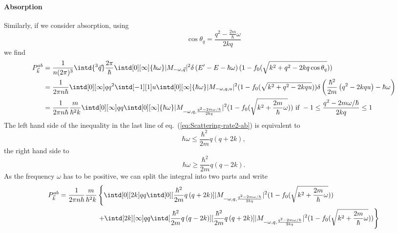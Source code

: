 \documentclass[physics,phd,nolot,nolof]{uccthesis}%
\begin{document}
{\paragraph*{Absorption}
Similarly, if we consider absorption, using
\begin{equation}
  \cos\theta_q=\frac{q^2 -\frac{2m}{\hbar}\omega}{2kq}
  \label{eq:costhetaq-ab}
\end{equation}
we find
\begin{equation}
  \begin{split}
  P^{ab}_{\vec k}
&  =\frac{1}{n(2\pi)^3}\intd{^3\vec q} 
  \frac{2\pi}{\hbar} 
  \intd[0][\infty]{\hbar\omega}|M_{-\omega,\vec q}|^2 \delta\left(E' - E -\hbar\omega \right)
  (1-f_0( \sqrt{k^2 +q^2 -2 kq \cos\theta_q}))\\
& = \frac{1}{ 2\pi n \hbar}\intd[0][\infty]q q^2\intd[-1][1]u
 \intd[0][\infty]{\hbar\omega}|M_{-\omega,q,u}|^2
  (1-f_0( \sqrt{k^2 +q^2 -2 kq u}))
  \delta\left(\frac{\hbar^2}{2m}\left(q^2  - 2kq u \right) -\hbar\omega \right)\\
 & =\frac{1}{ 2\pi n \hbar}
  \frac{m}{\hbar^2 k}
 \intd[0][\infty]q q
 \intd[0][\infty]{\hbar\omega}
  |M_{-\omega,q, \frac{q^2 -2m\omega/\hbar}{2kq}}|^2
(1-f_0( \sqrt{k^2 +\frac{2m}{\hbar}\omega})) 
\text{ if } -1\leq\frac{q^2 -2m\omega/\hbar}{2kq}\leq 1
  \end{split}
  \label{eq:Scattering-rate2-ab}
\end{equation}
The left hand side of the inequality in the last line of eq.~(\ref{eq:Scattering-rate2-ab}) is equivalent to
\[
\hbar\omega\leq \frac{\hbar^2}{2m}q(q+2k),
\]
the right hand side to
\[
\hbar\omega\geq \frac{\hbar^2}{2m}q(q-2k).
\]
As the frequency $\omega$ has to be positive, we can split the integral
into two parts and write
\begin{equation}
  \begin{split}
  P^{ab}_{\vec k} 
  =\frac{1}{ 2\pi n \hbar}
  \frac{m}{\hbar^2 k}
&  \left\{
  \intd[0][2k]q q
 \intd[0][\frac{\hbar^2}{2m}q\left(q+2k\right)]
  |M_{-\omega,q, \frac{q^2 -2m\omega/\hbar}{2kq}}|^2
(1-f_0( \sqrt{k^2 +\frac{2m}{\hbar}\omega})) 
\right.\\
&\left.
+  \intd[2k][\infty]q q
  \intd[\frac{\hbar^2}{2m}q\left(q-2k\right)][\frac{\hbar^2}{2m}q\left(q+2k\right)]
  |M_{-\omega,q, \frac{q^2 -2m\omega/\hbar}{2kq}}|^2
(1-f_0( \sqrt{k^2 +\frac{2m}{\hbar}\omega})) 
\right\}
  \end{split}
  \label{eq:Scattering-rate3-ab}
\end{equation}

}
\end{document}
